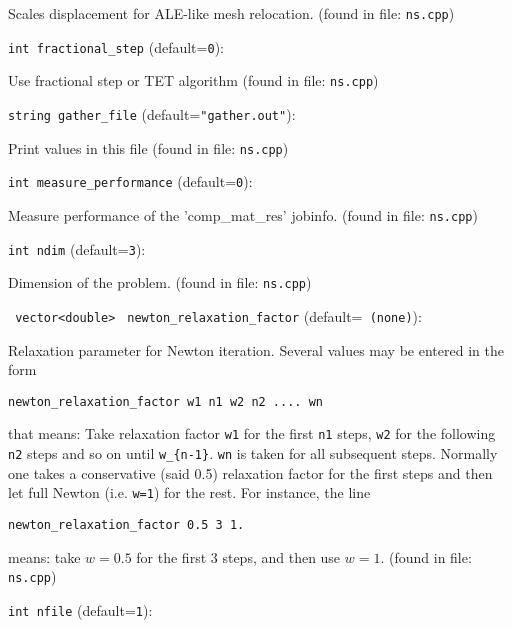Scales displacement for ALE-like mesh relocation. 
 (found in file: \verb+ns.cpp+)
\item\verb+int fractional_step+ {\rm(default=\verb|0|)}:

Use fractional step or TET algorithm
 (found in file: \verb+ns.cpp+)
\item\verb+string gather_file+ {\rm(default=\verb|"gather.out"|)}:

Print values in this file 
 (found in file: \verb+ns.cpp+)
\item\verb+int measure_performance+ {\rm(default=\verb|0|)}:

Measure performance of the 'comp\_mat\_res' jobinfo. 
 (found in file: \verb+ns.cpp+)
\item\verb+int ndim+ {\rm(default=\verb|3|)}:

Dimension of the problem.
 (found in file: \verb+ns.cpp+)
\item\verb+ vector<double>+ \verb+ newton_relaxation_factor+ {\rm(default=\verb| (none)|)}:

Relaxation parameter for Newton iteration. Several
values may be entered in the form
%
\begin{verbatim} 
newton_relaxation_factor w1 n1 w2 n2 .... wn
\end{verbatim}
%
that means: Take relaxation factor \verb+w1+
for the first \verb+n1+ steps, \verb+w2+ for the following \verb+n2+ steps
and so on until \verb+w_{n-1}+. \verb+wn+ is taken for all subsequent 
steps. Normally one takes a conservative (said 0.5) relaxation
factor for the first steps and then let full Newton (i.e. \verb+w=1+)
for the rest. For instance, the line  
%
\begin{verbatim} 
newton_relaxation_factor 0.5 3 1.
\end{verbatim}
%
means: take $w=0.5$ for the first 3 steps, and then use $w=1$. 
 (found in file: \verb+ns.cpp+)
\item\verb+int nfile+ {\rm(default=\verb|1|)}:

